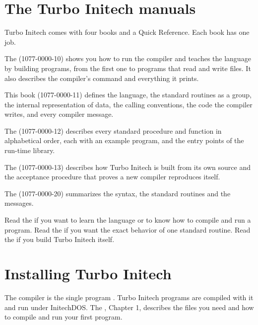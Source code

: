 \section{The Turbo Initech manuals}
Turbo Initech comes with four books and a Quick Reference.  Each book has
one job.

The 
(1077-0000-10) shows you how to run the compiler and teaches the language
by building programs, from the first one to programs that read and write
files.  It also describes the compiler's command and everything it prints.

This book (1077-0000-11) defines the language,
the standard routines as a group, the internal representation of data, the
calling conventions, the code the compiler writes, and every compiler
message.

The 
(1077-0000-12) describes every standard procedure and function in
alphabetical order, each with an example program, and the entry points of
the run-time library.

The  (1077-0000-13) describes how Turbo Initech is built
from its own source and the acceptance procedure that proves a new
compiler reproduces itself.

The 
(1077-0000-20) summarizes the syntax, the standard routines and the
messages.

Read the  if you want to learn the language or to
know how to compile and run a program.  Read the  if you want the exact behavior of one standard routine.  Read the
 if you build Turbo Initech itself.

\section{Installing Turbo Initech}
The compiler is the single program .  Turbo Initech programs
are compiled with it and run under InitechDOS.  The ,
Chapter 1, describes the files you need and how to compile and run your
first program.

